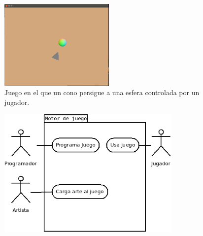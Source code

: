 \begin{figure}[!htbp!]
\centering
\includegraphics[width=0.5\textwidth]{gameia}
\caption[Programa de prueba 4]{Juego en el que un cono persigue a una esfera controlada por un jugador.}
\label{fig:gameia}
\end{figure}

\begin{figure}[!htbp!]
\centering
\includegraphics[width=0.8\textwidth]{MCU}
\caption[Diagrama de casos de uso]{}
\label{fig:MCU}
\end{figure}
